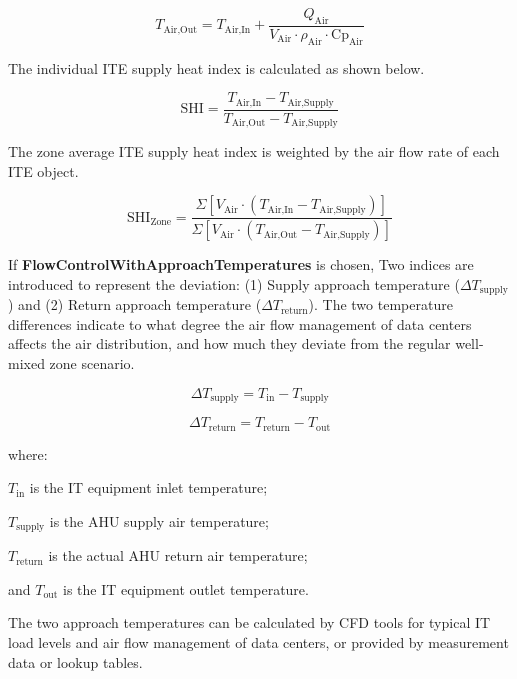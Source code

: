 \begin{equation}
T_{\textrm{Air,Out}} = T_{\textrm{Air,In}} + \frac{Q_{\textrm{Air}}}{V_{\textrm{Air}} \cdot \rho_{\textrm{Air}} \cdot \textrm{Cp}_{\textrm{Air}}}
\end{equation}

The individual ITE supply heat index is calculated as shown below.

\begin{equation}
\textrm{SHI} = \frac{T_{\textrm{Air,In}} - T_{\textrm{Air,Supply}}}{T_{\textrm{Air,Out}} - T_{\textrm{Air,Supply}}}
\end{equation}

The zone average ITE supply heat index is weighted by the air flow rate of each ITE object.

\begin{equation}
\textrm{SHI}_{\textrm{Zone}} = \frac{\Sigma[V_{\textrm{Air}} \cdot (T_{\textrm{Air,In}} - T_{\textrm{Air,Supply}})]}{\Sigma[V_{\textrm{Air}} \cdot (T_{\textrm{Air,Out}} - T_{\textrm{Air,Supply}})]}
\end{equation}

If \textbf{FlowControlWithApproachTemperatures} is chosen, Two indices are introduced to represent the deviation: (1) Supply approach temperature ($\Delta T_{\textrm{supply}}$) and (2) Return approach temperature ($\Delta T_{\textrm{return}}$). The two temperature differences indicate to what degree the air flow management of data centers affects the air distribution, and how much they deviate from the regular well-mixed zone scenario.

\begin{equation}
\Delta T_{\textrm{supply}}=T_{\textrm{in}}-T_{\textrm{supply}}
\end{equation}

\begin{equation}
\Delta T_{\textrm{return}}=T_{\textrm{return}}-T_{\textrm{out}}
\end{equation}

where:

$T_{\textrm{in}}$ is the IT equipment inlet temperature;

$T_{\textrm{supply}}$ is the AHU supply air temperature;

$T_{\textrm{return}}$ is the actual AHU return air temperature;

and $T_{\textrm{out}}$ is the IT equipment outlet temperature.

The two approach temperatures can be calculated by CFD tools for typical IT load levels and air flow management of data centers, or provided by measurement data or lookup tables. 

